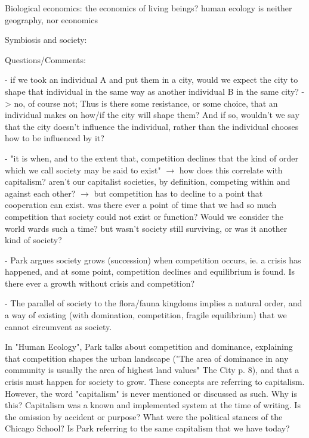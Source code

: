 \documentclass{article}
\begin{document}
Biological economics: the economics of living beings? human ecology is neither geography, nor economics

Symbiosis and society: 

Questions/Comments: 

- if we took an individual A and put them in a city, would we expect the city to shape that individual in the same way as another individual B in the same city? -> no, of course not; Thus is there some resistance, or some choice, that an individual makes on how/if the city will shape them? And if so, wouldn't we say that the city doesn't influence the individual, rather than the individual chooses how to be influenced by it?

- "it is when, and to the extent that, competition declines that the kind of order which we call society may be said to exist" $\rightarrow$ how does this correlate with capitalism? aren't our capitalist societies, by definition, competing within and against each other? $\rightarrow$ but competition has to decline to a point that cooperation can exist. was there ever a point of time that we had so much competition that society could not exist or function? Would we consider the world wards such a time? but wasn't society still surviving, or was it another kind of society? 

- Park argues society grows (succession) when competition occurs, ie. a crisis has happened, and at some point, competition declines and equilibrium is found. Is there ever a growth without crisis and competition?

- The parallel of society to the flora/fauna kingdoms implies a natural order, and a way of existing (with domination, competition, fragile equilibrium) that we cannot circumvent as society. 

\begin{outline}
	\1 In "Human Ecology", Park talks about competition and dominance, explaining that competition shapes the urban landscape ("The area of dominance in any community is usually the area of highest land values" The City p. 8), and that a crisis must happen for society to grow. These concepts are referring to capitalism.
However, the word "capitalism" is never mentioned or discussed as such. Why is this? Capitalism was a known and implemented system at the time of writing. Is the omission by accident or purpose? What were the political stances of the Chicago School? Is Park referring to the same capitalism that we have today?
\end{outline}
\end{document}
